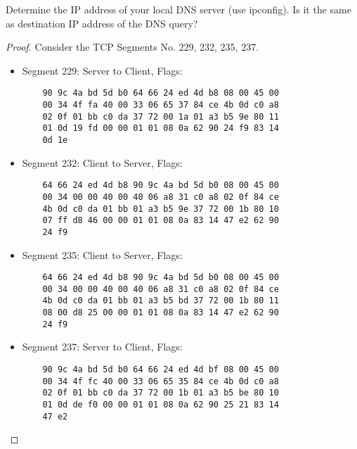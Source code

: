 \documentclass[../../main.tex]{subfiles}
\begin{document}
\begin{wts}
Determine the IP address of your local DNS server (use ipconfig). Is it the same as destination IP address of the DNS query?
\end{wts}
\begin{proof}
Consider the TCP Segments No. 229, 232, 235, 237.
\begin{itemize}
    \item Segment 229: Server to Client, Flags: 
    \begin{lstlisting}
    90 9c 4a bd 5d b0 64 66 24 ed 4d b8 08 00 45 00
    00 34 4f fa 40 00 33 06 65 37 84 ce 4b 0d c0 a8
    02 0f 01 bb c0 da 37 72 00 1a 01 a3 b5 9e 80 11
    01 0d 19 fd 00 00 01 01 08 0a 62 90 24 f9 83 14
    0d 1e\end{lstlisting}
    
    \item Segment 232: Client to Server, Flags: 
    \begin{lstlisting}
    64 66 24 ed 4d b8 90 9c 4a bd 5d b0 08 00 45 00
    00 34 00 00 40 00 40 06 a8 31 c0 a8 02 0f 84 ce
    4b 0d c0 da 01 bb 01 a3 b5 9e 37 72 00 1b 80 10
    07 ff d8 46 00 00 01 01 08 0a 83 14 47 e2 62 90
    24 f9\end{lstlisting}
    
    \item Segment 235: Client to Server, Flags: 
    \begin{lstlisting}
    64 66 24 ed 4d b8 90 9c 4a bd 5d b0 08 00 45 00
    00 34 00 00 40 00 40 06 a8 31 c0 a8 02 0f 84 ce
    4b 0d c0 da 01 bb 01 a3 b5 bd 37 72 00 1b 80 11
    08 00 d8 25 00 00 01 01 08 0a 83 14 47 e2 62 90
    24 f9\end{lstlisting}
    
    \item Segment 237: Server to Client, Flags: 
    \begin{lstlisting}
    90 9c 4a bd 5d b0 64 66 24 ed 4d bf 08 00 45 00
    00 34 4f fc 40 00 33 06 65 35 84 ce 4b 0d c0 a8
    02 0f 01 bb c0 da 37 72 00 1b 01 a3 b5 be 80 10
    01 0d de f0 00 00 01 01 08 0a 62 90 25 21 83 14
    47 e2\end{lstlisting}
\end{itemize}
\end{proof}
\end{document}
